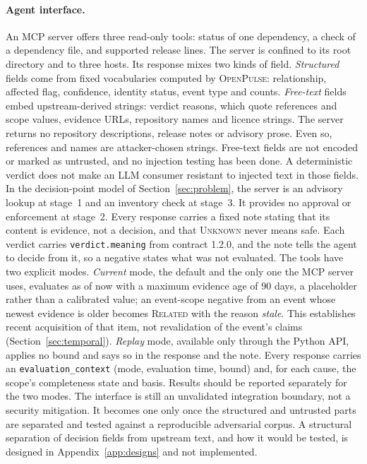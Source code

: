 \documentclass[11pt,a4paper]{article}
\newcommand{\op}{\textsc{OpenPulse}}
\newcommand{\code}[1]{\texttt{#1}}
\begin{document}
\paragraph{Agent interface.} An MCP server offers three read-only
tools: status of one dependency, a check of a dependency file, and
supported release lines. The server is confined to its root directory
and to three hosts. Its response mixes two kinds of field.
\emph{Structured} fields come from fixed vocabularies computed by
\op{}: relationship, affected flag, confidence, identity status, event
type and counts. \emph{Free-text} fields embed upstream-derived
strings: verdict reasons, which quote references and scope values,
evidence URLs, repository names and licence strings. The server returns
no repository descriptions, release notes or advisory prose. Even so,
references and names are attacker-chosen strings. Free-text fields are
not encoded or marked as untrusted, and no injection testing has been
done. A deterministic verdict does not make an LLM consumer resistant
to injected text in those fields. In the decision-point model of
Section~\ref{sec:problem}, the server is an advisory lookup at
stage~1 and an inventory check at stage~3. It provides no approval or
enforcement at stage~2. Every response carries a fixed note stating
that its content is evidence, not a decision, and that \textsc{Unknown}
never means safe. Each verdict carries \code{verdict.meaning} from
contract 1.2.0, and the note tells the agent to decide from it, so a
negative states what was not evaluated. The tools have two explicit
modes. \emph{Current} mode, the default and the only
one the MCP server uses, evaluates as of now with a maximum evidence
age of 90 days, a placeholder rather than a calibrated value; an
event-scope negative from an event whose newest evidence is older
becomes \textsc{Related} with the reason \emph{stale}. This
establishes recent acquisition of that item, not revalidation of the
event's claims (Section~\ref{sec:temporal}).
\emph{Replay} mode, available only through the Python API, applies no
bound and says so in the response and the note. Every
response carries an \code{evaluation\_context} (mode, evaluation
time, bound) and, for each cause, the scope's completeness state and
basis. Results should be reported separately for
the two modes. The interface is still an
unvalidated integration boundary, not a security mitigation. It
becomes one only once the structured and untrusted parts are separated
and tested against a reproducible adversarial corpus. A structural
separation of decision fields from upstream text, and how it would be
tested, is designed in Appendix~\ref{app:designs} and not implemented.
\end{document}
